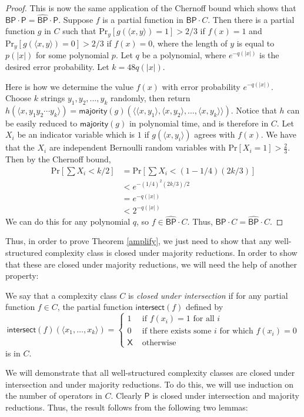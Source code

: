 \documentclass[11pt]{article}
\newcommand{\pr}{\text{Pr}}
\newcommand{\bp}{\textsf{BP}}
\newcommand{\strongbp}{\widehat{\textsf{BP}}}
\newcommand{\p}{\textsf{P}}
\newcommand{\x}{\textsf{X}}
\newcommand{\intersection}{\textsf{intersect}}
\newcommand{\intersect}{\textsf{intersect}}
\newcommand{\majority}{\textsf{majority}}
\begin{document}
\begin{proof}
This is now the same application of the Chernoff bound which shows that $\bp \cdot \p = \strongbp \cdot \p$. Suppose $f$ is a partial function in $\bp \cdot C$. Then there is a partial function $g$ in $C$ such that $\pr_y [g(\langle x,y\rangle) = 1] > 2/3$ if $f(x) = 1$ and $\pr_y [g(\langle x, y\rangle) = 0] > 2/3$ if $f(x) = 0$, where the length of $y$ is equal to $p(|x|)$ for some polynomial $p$. Let $q$ be a polynomial, where $e^{-q(|x|)}$ is the desired error probability. Let $k = 48q(|x|)$.

Here is how we determine the value $f(x)$ with error probability $e^{-q(|x|)}$. Choose $k$ strings $y_1,y_2,...,y_k$ randomly, then return $h(\langle x, y_1y_2\cdots y_k\rangle) = \majority(g)(\langle \langle x, y_1 \rangle, \langle x, y_2 \rangle, \ldots, \langle x, y_k \rangle \rangle)$. Notice that $h$ can be easily reduced to $\majority(g)$ in polynomial time, and is therefore in $C$.
Let $X_i$ be an indicator variable which is $1$ if $g(\langle x,y_i\rangle)$ agrees with $f(x)$. We have that the $X_i$ are independent Bernoulli random variables with $\pr\left[X_i = 1\right] > \frac{2}{3}$.  Then by the Chernoff bound,
\begin{align*}
\pr\left[\sum X_i < k/2\right] &= \pr\left[\sum X_i < (1 - 1/4)(2k/3)\right]\\
&< e^{-(1/4)^2 (2k/3) / 2}\\
&= e^{-q(|x|)} \\
&< 2^{-q(|x|)}
\end{align*}
We can do this for any polynomial $q$, so $f \in \strongbp \cdot C$. Thus, $\bp \cdot C = \strongbp \cdot C$.
\end{proof}

Thus, in order to prove Theorem \ref{amplify}, we just need to show that any well-structured complexity class is closed under majority reductions. In order to show that these are closed under majority reductions, we will need the help of another property:
\begin{definition}\label{defintersection}
We say that a complexity class $C$ is \emph{closed under intersection} if for any partial function $f \in C$, the partial function $\intersect(f)$ defined by
$$\intersect(f)(\langle x_1, \ldots, x_k\rangle) = 
\begin{cases}1 & \text{ if $f(x_i) = 1$ for all $i$} \\
0 & \text{ if there exists some $i$ for which $f(x_i) = 0$}\\
\x & \text{ otherwise}
\end{cases}$$
is in $C$.
\end{definition}
We will demonstrate that all well-structured complexity classes are closed under intersection and under majority reductions. To do this, we will use induction on the number of operators in $C$. Clearly $\p$ is closed under intersection and majority reductions. Thus, the result follows from the following two lemmas:
\end{document}
